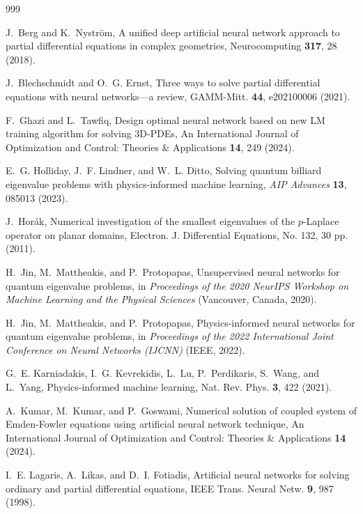 \documentclass[11pt]{amsart}
\theoremstyle{definition}
\theoremstyle{remark}
\theoremstyle{plain}
\begin{document}
\begin{thebibliography}{999}

J.~Berg and K.~Nystr\"om,
A unified deep artificial neural network approach to partial differential equations in complex geometries,
Neurocomputing \textbf{317}, 28 (2018).

J.~Blechschmidt and O.~G. Ernst,
Three ways to solve partial differential equations with neural networks---a review,
GAMM-Mitt. \textbf{44}, e202100006 (2021).


F.~Ghazi and L.~Tawfiq,
Design optimal neural network based on new LM training algorithm for solving 3D-PDEs,
An International Journal of Optimization and Control: Theories \& Applications \textbf{14}, 249 (2024).

E.~G. Holliday, J.~F. Lindner, and W.~L. Ditto,
Solving quantum billiard eigenvalue problems with physics-informed machine learning,
\textit{AIP Advances} \textbf{13}, 085013 (2023).

J.~Hor\'ak,
Numerical investigation of the smallest eigenvalues of the $p$-Laplace operator on planar domains,
Electron. J. Differential Equations, No. 132, 30 pp. (2011).

H.~Jin, M.~Mattheakis, and P.~Protopapas,
Unsupervised neural networks for quantum eigenvalue problems,
in \textit{Proceedings of the 2020 NeurIPS Workshop on Machine Learning and the Physical Sciences}
(Vancouver, Canada, 2020).

H.~Jin, M.~Mattheakis, and P.~Protopapas,
Physics-informed neural networks for quantum eigenvalue problems,
in \textit{Proceedings of the 2022 International Joint Conference on Neural Networks (IJCNN)}
(IEEE, 2022).

G.~E. Karniadakis, I.~G. Kevrekidis, L.~Lu, P.~Perdikaris, S.~Wang, and L.~Yang,
Physics-informed machine learning,
Nat. Rev. Phys. \textbf{3}, 422 (2021).



A.~Kumar, M.~Kumar, and P.~Goswami,
Numerical solution of coupled system of Emden-Fowler equations using artificial neural network technique,
An International Journal of Optimization and Control: Theories \& Applications \textbf{14} (2024).

I.~E. Lagaris, A.~Likas, and D.~I. Fotiadis,
Artificial neural networks for solving ordinary and partial differential equations,
IEEE Trans. Neural Netw. \textbf{9}, 987 (1998).


\end{thebibliography}
\end{document}

